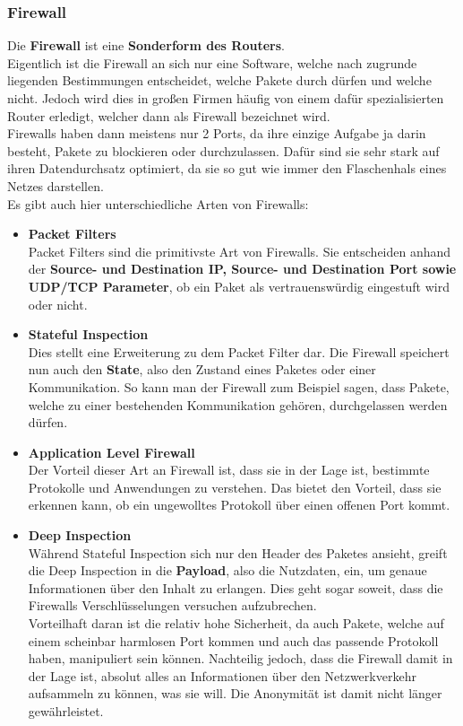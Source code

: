 \documentclass[12pt,a4paper]{report}
\begin{document}
\subsubsection{Firewall}
Die \textbf{Firewall} ist eine \textbf{Sonderform des Routers}.\\
Eigentlich ist die Firewall an sich nur eine Software, welche nach zugrunde liegenden Bestimmungen entscheidet, welche Pakete durch dürfen und welche nicht. Jedoch wird dies in großen Firmen häufig von einem dafür spezialisierten Router erledigt, welcher dann als Firewall bezeichnet wird.\\
Firewalls haben dann meistens nur 2 Ports, da ihre einzige Aufgabe ja darin besteht, Pakete zu blockieren oder durchzulassen. Dafür sind sie sehr stark auf ihren Datendurchsatz optimiert, da sie so gut wie immer den Flaschenhals eines Netzes darstellen.\\
Es gibt auch hier unterschiedliche Arten von Firewalls:\\
\begin{itemize}
\item \textbf{Packet Filters}\\
Packet Filters sind die primitivste Art von Firewalls. Sie entscheiden anhand der \textbf{Source- und Destination IP, Source- und Destination Port sowie UDP/TCP Parameter}, ob ein Paket als vertrauenswürdig eingestuft wird oder nicht.
\item \textbf{Stateful Inspection}\\
Dies stellt eine Erweiterung zu dem Packet Filter dar. Die Firewall speichert nun auch den \textbf{State}, also den Zustand eines Paketes oder einer Kommunikation. So kann man der Firewall zum Beispiel sagen, dass Pakete, welche zu einer bestehenden Kommunikation gehören, durchgelassen werden dürfen. 
\item \textbf{Application Level Firewall}\\
Der Vorteil dieser Art an Firewall ist, dass sie in der Lage ist, bestimmte Protokolle und Anwendungen zu \glqq verstehen\grqq . Das bietet den Vorteil, dass sie erkennen kann, ob ein ungewolltes Protokoll über einen offenen Port kommt.
\item \textbf{Deep Inspection}\\
Während Stateful Inspection sich nur den Header des Paketes ansieht, greift die Deep Inspection in die \textbf{Payload}, also die Nutzdaten, ein, um genaue Informationen über den Inhalt zu erlangen. Dies geht sogar soweit, dass die Firewalls Verschlüsselungen versuchen aufzubrechen.\\
Vorteilhaft daran ist die relativ hohe Sicherheit, da auch Pakete, welche auf einem scheinbar harmlosen Port kommen und auch das passende Protokoll haben, manipuliert sein können. Nachteilig jedoch, dass die Firewall damit in der Lage ist, absolut alles an Informationen über den Netzwerkverkehr aufsammeln zu können, was sie will. Die Anonymität ist damit nicht länger gewährleistet.
\end{itemize}
\end{document}
